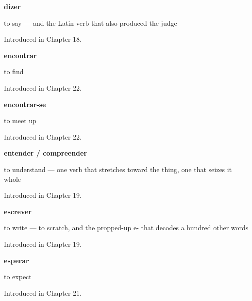 \noindent\begin{minipage}[t]{\linewidth}
\raggedright
\textbf{dizer}\par
\small to say — and the Latin verb that also produced the judge\par
\footnotesize Introduced in Chapter 18.
\end{minipage}\par\medskip

\noindent\begin{minipage}[t]{\linewidth}
\raggedright
\textbf{encontrar}\par
\small to find\par
\footnotesize Introduced in Chapter 22.
\end{minipage}\par\medskip

\noindent\begin{minipage}[t]{\linewidth}
\raggedright
\textbf{encontrar-se}\par
\small to meet up\par
\footnotesize Introduced in Chapter 22.
\end{minipage}\par\medskip

\noindent\begin{minipage}[t]{\linewidth}
\raggedright
\textbf{entender / compreender}\par
\small to understand — one verb that stretches toward the thing, one that seizes it whole\par
\footnotesize Introduced in Chapter 19.
\end{minipage}\par\medskip

\noindent\begin{minipage}[t]{\linewidth}
\raggedright
\textbf{escrever}\par
\small to write — to scratch, and the propped-up e- that decodes a hundred other words\par
\footnotesize Introduced in Chapter 19.
\end{minipage}\par\medskip

\noindent\begin{minipage}[t]{\linewidth}
\raggedright
\textbf{esperar}\par
\small to expect\par
\footnotesize Introduced in Chapter 21.
\end{minipage}\par\medskip

